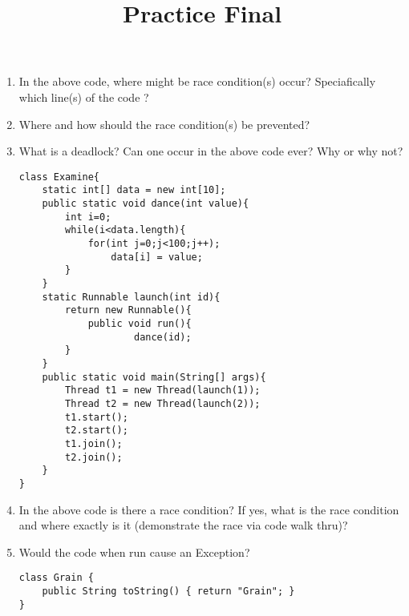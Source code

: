\documentclass{article}
\author{}
\date{}
\title{Practice Final}
\begin{document}
\maketitle
\begin{enumerate}
\begin{lstlisting}
class Race{
	public static final int MAX = 5;
 	public static final int MIN = 1;

 	private static int data=Race.MIN;
	public static int getData(){
		return data;
	}
	public static void incData() {
		if (data < Race.MAX)
			data++;
	}
	public static void foo() throws Exception{
		while (data < Race.MAX)
			incData();
	}
}

public class Car implements Runnable { 
	public void run(){
		Race.foo();
	}
	public static void main(String[] args) throws Exception{
  		Thread t1 = new Thread(new Car());
  		Thread t2 = new Thread(new Car());
  		t1.start();
  		t2.start();
  		t1.join();
  		t2.join();
  		System.out.println(Race.getData());
 	}
}
\end{lstlisting}
	\item In the above code, where might be race condition(s) occur? Speciafically which line(s) of the code ?
	\item Where and how should the race condition(s) be prevented?
	\item What is a deadlock? Can one occur in the above code ever? Why or why not?
\newpage
\begin{lstlisting}
class Examine{
 	static int[] data = new int[10];
 	public static void dance(int value){
  		int i=0;
  		while(i<data.length){
   			for(int j=0;j<100;j++);
   				data[i] = value;
  		}
 	}
 	static Runnable launch(int id){
  		return new Runnable(){
   			public void run(){
    				dance(id);
   		}
 	}
 	public static void main(String[] args){
  		Thread t1 = new Thread(launch(1));
  		Thread t2 = new Thread(launch(2));
  		t1.start();
  		t2.start();
  		t1.join();
  		t2.join();
 	}
}
\end{lstlisting}
	\item In the above code is there a race condition? If yes, what is the race condition and where exactly is it (demonstrate the race via code walk thru)? 
	\item Would the code when run cause an Exception? 
\newpage
\begin{lstlisting}
class Grain {
  	public String toString() { return "Grain"; }
}


\end{lstlisting}
\end{enumerate}
\end{document}
